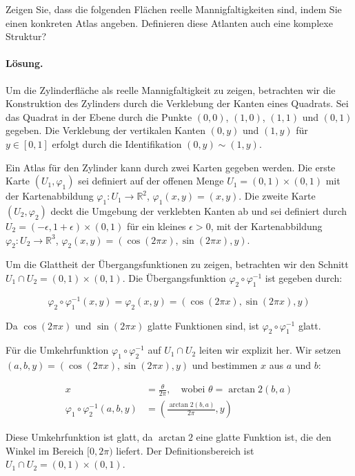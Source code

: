 \documentclass[11pt,a4paper]{article}
\begin{document}
Zeigen Sie, dass die folgenden Flächen reelle Mannigfaltigkeiten sind, indem Sie einen konkreten Atlas angeben. Definieren diese Atlanten auch eine komplexe Struktur?

\paragraph{Lösung.}
Um die Zylinderfläche als reelle Mannigfaltigkeit zu zeigen, betrachten wir die Konstruktion des Zylinders durch die Verklebung der Kanten eines Quadrats. Sei das Quadrat in der Ebene durch die Punkte \((0,0)\), \((1,0)\), \((1,1)\) und \((0,1)\) gegeben. Die Verklebung der vertikalen Kanten \((0,y)\) und \((1,y)\) für \(y \in [0,1]\) erfolgt durch die Identifikation \((0,y) \sim (1,y)\).

Ein Atlas für den Zylinder kann durch zwei Karten gegeben werden. Die erste Karte \((U_1, \varphi_1)\) sei definiert auf der offenen Menge \(U_1 = (0,1) \times (0,1)\) mit der Kartenabbildung \(\varphi_1: U_1 \to \mathbb{R}^2\), \(\varphi_1(x,y) = (x,y)\). Die zweite Karte \((U_2, \varphi_2)\) deckt die Umgebung der verklebten Kanten ab und sei definiert durch \(U_2 = (-\epsilon, 1+\epsilon) \times (0,1)\) für ein kleines \(\epsilon > 0\), mit der Kartenabbildung \(\varphi_2: U_2 \to \mathbb{R}^3\), \(\varphi_2(x,y) = (\cos(2\pi x), \sin(2\pi x), y)\).

Um die Glattheit der Übergangsfunktionen zu zeigen, betrachten wir den Schnitt \(U_1 \cap U_2 = (0,1) \times (0,1)\). Die Übergangsfunktion \(\varphi_2 \circ \varphi_1^{-1}\) ist gegeben durch:

\[
\varphi_2 \circ \varphi_1^{-1}(x,y) = \varphi_2(x,y) = (\cos(2\pi x), \sin(2\pi x), y)
\]

Da \(\cos(2\pi x)\) und \(\sin(2\pi x)\) glatte Funktionen sind, ist \(\varphi_2 \circ \varphi_1^{-1}\) glatt.

Für die Umkehrfunktion \(\varphi_1 \circ \varphi_2^{-1}\) auf \(U_1 \cap U_2\) leiten wir explizit her. Wir setzen \((a, b, y) = (\cos(2\pi x), \sin(2\pi x), y)\) und bestimmen \(x\) aus \(a\) und \(b\):

\[
\begin{align*}
x &= \frac{\theta}{2\pi}, \quad \text{wobei } \theta = \arctan2(b, a) \\
\varphi_1 \circ \varphi_2^{-1}(a, b, y) &= \left(\frac{\arctan2(b, a)}{2\pi}, y\right)
\end{align*}
\]

Diese Umkehrfunktion ist glatt, da \(\arctan2\) eine glatte Funktion ist, die den Winkel im Bereich \([0, 2\pi)\) liefert. Der Definitionsbereich ist \(U_1 \cap U_2 = (0,1) \times (0,1)\).
\end{document}
